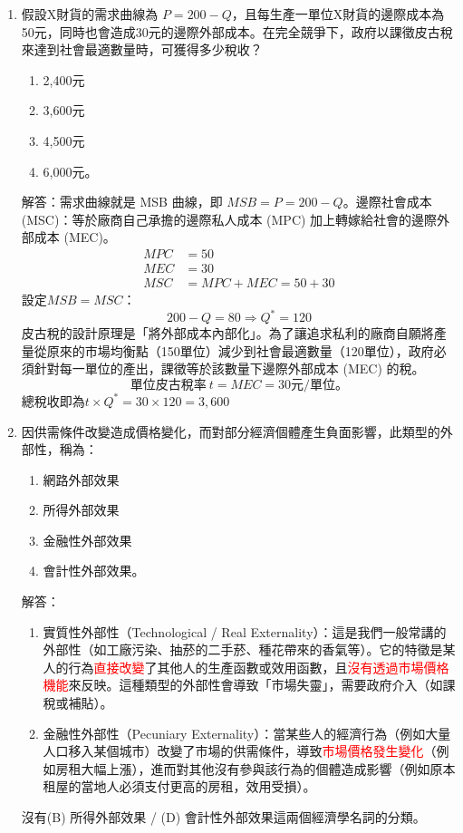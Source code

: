 \documentclass[12pt, a4paper]{article}
\begin{document}
\begin{enumerate}
    \item 假設X財貨的需求曲線為 \(P=200-Q\)，且每生產一單位X財貨的邊際成本為50元，同時也會造成30元的邊際外部成本。在完全競爭下，政府以課徵皮古稅來達到社會最適數量時，可獲得多少稅收？
    \begin{enumerate}[label=\Alph*.]
        \item 2,400元
        \item 3,600元
        \item 4,500元
        \item 6,000元。
    \end{enumerate}
    解答：需求曲線就是 MSB 曲線，即 \(MSB = P = 200 - Q\)。邊際社會成本 (MSC)：等於廠商自己承擔的邊際私人成本 (MPC) 加上轉嫁給社會的邊際外部成本 (MEC)。
    \begin{align*}
        MPC &= 50 \\
        MEC &= 30 \\
        MSC &= MPC + MEC = 50 + 30
    \end{align*}
    設定$MSB = MSC$：
    \[
    200 - Q = 80 \Rightarrow Q^* = 120
    \]
    皮古稅的設計原理是「將外部成本內部化」。為了讓追求私利的廠商自願將產量從原來的市場均衡點（150單位）減少到社會最適數量（120單位），政府必須針對每一單位的產出，課徵等於該數量下邊際外部成本 (MEC) 的稅。
    \[
    \boxed{單位皮古稅率\ t = MEC = 30元/單位。}
    \]
    總稅收即為$t\times Q^* = 30 \times 120 = 3,600$

    \item 因供需條件改變造成價格變化，而對部分經濟個體產生負面影響，此類型的外部性，稱為：
    \begin{enumerate}[label=\Alph*.]
        \item 網路外部效果
        \item 所得外部效果
        \item 金融性外部效果
        \item 會計性外部效果。
    \end{enumerate}
    解答：
    \begin{enumerate}[1.]
        \item 實質性外部性（Technological / Real Externality）：這是我們一般常講的外部性（如工廠污染、抽菸的二手菸、種花帶來的香氣等）。它的特徵是某人的行為\textcolor{red}{直接改變}了其他人的生產函數或效用函數，且\textcolor{red}{沒有透過市場價格機能}來反映。這種類型的外部性會導致「市場失靈」，需要政府介入（如課稅或補貼）。
        \item 金融性外部性（Pecuniary Externality）：當某些人的經濟行為（例如大量人口移入某個城市）改變了市場的供需條件，導致\textcolor{red}{市場價格發生變化}（例如房租大幅上漲），進而對其他沒有參與該行為的個體造成影響（例如原本租屋的當地人必須支付更高的房租，效用受損）。
    \end{enumerate}
    沒有(B) 所得外部效果 / (D) 會計性外部效果這兩個經濟學名詞的分類。


\end{enumerate}
\end{document}
